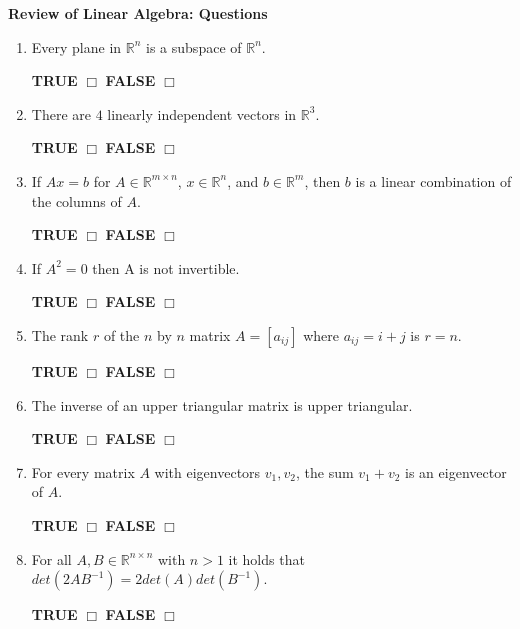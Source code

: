 \documentclass[14pt]{report}
\begin{document}
\textbf{{Review of Linear Algebra: Questions}}\\
\thispagestyle{empty}


\begin{enumerate}
\item Every plane in $\mathbb{R}^n$ is a subspace of $\mathbb{R}^n$.  

\quad \textbf{TRUE} $\Box$ \quad\textbf{FALSE} $\Box$ 

\item There are $4$ linearly independent vectors in $\mathbb{R}^3$. 

\quad \textbf{TRUE} $\Box$ \quad\textbf{FALSE} $\Box$ 

\item If $Ax=b$ for $A \in \mathbb{R}^{m\times n}$, $x\in\mathbb{R}^n$, and  $b\in\mathbb{R}^m$, then $b$ is a linear combination of the columns of $A$.

 \quad \textbf{TRUE} $\Box$ \quad\textbf{FALSE} $\Box$


\item If $A^2=0$ then A is not invertible.

 \quad \textbf{TRUE} $\Box$ \quad\textbf{FALSE} $\Box$ 



\item The rank $r$ of the $n$ by $n$ matrix $A=[a_{ij}]$ where $a_{ij}=i+j$ is $r=n$.

 \quad \textbf{TRUE} $\Box$ \quad\textbf{FALSE} $\Box$


 

\item The inverse of an upper triangular matrix is upper triangular. 

\quad \textbf{TRUE} $\Box$ \quad\textbf{FALSE} $\Box$ 

\item For every  matrix $A$ with eigenvectors $v_1, v_2$, the sum $v_1 + v_2$ is an eigenvector of $A$. 

\quad \textbf{TRUE} $\Box$ \quad\textbf{FALSE} $\Box$ 

\item For all $A,B \in \mathbb{R}^{n \times n}$ with $n >1$ it holds that $det(2AB^{-1})=2det(A)det(B^{-1})$. 

\quad \textbf{TRUE} $\Box$ \quad\textbf{FALSE} $\Box$ 


\end{enumerate}
\end{document}
